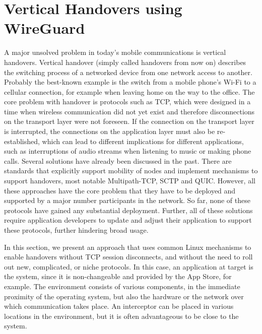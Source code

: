 \section{Vertical Handovers using WireGuard}
\label{sec:wg:impl}

\newcommand{\ld}{\texttt{LD\_PRELOAD}\xspace}

A major unsolved problem in today's mobile communications is vertical handovers.
Vertical handover (simply called handovers from now on) describes the switching process of a networked device from one network access to another.
Probably the best-known example is the switch from a mobile phone's Wi-Fi to a cellular connection, for example when leaving home on the way to the office.
The core problem with handover is protocols such as TCP, which were designed in a time when wireless communication did not yet exist and therefore disconnections on the transport layer were not foreseen.
If the connection on the transport layer is interrupted, the connections on the application layer must also be re-established, which can lead to different implications for different applications, such as interruptions of audio streams when listening to music or making phone calls.
Several solutions have already been discussed in the past.
There are standards that explicitly support mobility of nodes and implement mechanisms to support handovers, most notable Multipath-TCP, SCTP and QUIC.
However, all these approaches have the core problem that they have to be deployed and supported by a major number participants in the network.
So far, none of these protocols have gained any substantial deployment.
Further, all of these solutions require application developers to update and adjust their application to support these protocols, further hindering broad usage.

In this section, we present an approach that uses common Linux mechanisms to enable handovers without TCP session disconnects, and without the need to roll out new, complicated, or niche protocols.
In this case, an application at target is the system, since it is non-changeable and provided by the App Store, for example.
The environment consists of various components, in the immediate proximity of the operating system, but also the hardware or the network over which communication takes place.
An interceptor can be placed in various locations in the environment, but it is often advantageous to be close to the system. 





